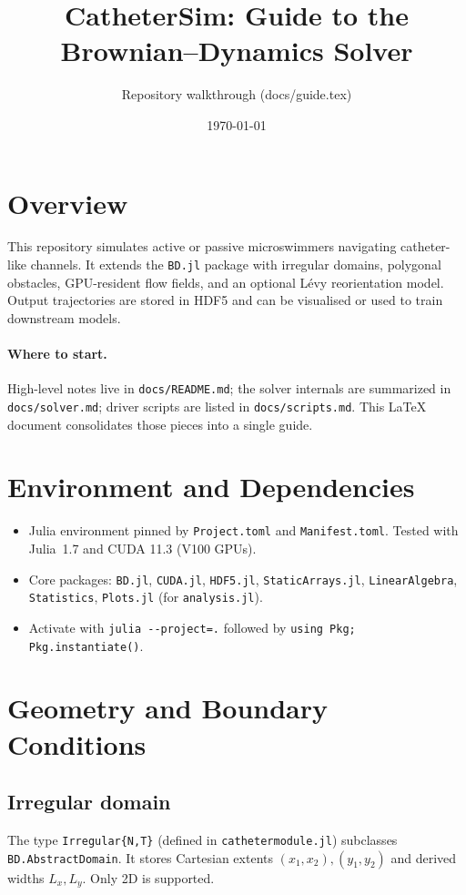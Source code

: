 \documentclass[11pt]{article}
\title{CatheterSim: Guide to the Brownian--Dynamics Solver}
\author{Repository walkthrough (docs/guide.tex)}
\date{\today}
\begin{document}
\maketitle
\tableofcontents
\newpage

\section{Overview}
This repository simulates active or passive microswimmers navigating catheter-like channels. It extends the \texttt{BD.jl} package with irregular domains, polygonal obstacles, GPU-resident flow fields, and an optional L\'evy reorientation model. Output trajectories are stored in HDF5 and can be visualised or used to train downstream models.

\paragraph{Where to start.} High-level notes live in \texttt{docs/README.md}; the solver internals are summarized in \texttt{docs/solver.md}; driver scripts are listed in \texttt{docs/scripts.md}. This \LaTeX{} document consolidates those pieces into a single guide.

\section{Environment and Dependencies}
\begin{itemize}[leftmargin=*]
  \item Julia environment pinned by \texttt{Project.toml} and \texttt{Manifest.toml}. Tested with Julia~1.7 and CUDA 11.3 (V100 GPUs).
  \item Core packages: \texttt{BD.jl}, \texttt{CUDA.jl}, \texttt{HDF5.jl}, \texttt{StaticArrays.jl}, \texttt{LinearAlgebra}, \texttt{Statistics}, \texttt{Plots.jl} (for \texttt{analysis.jl}).
  \item Activate with \verb|julia --project=.|
    followed by \verb|using Pkg; Pkg.instantiate()|.
\end{itemize}

\section{Geometry and Boundary Conditions}
\subsection{Irregular domain}
The type \texttt{Irregular\{N,T\}} (defined in \texttt{cathetermodule.jl}) subclasses \texttt{BD.AbstractDomain}. It stores Cartesian extents \((x_1,x_2),(y_1,y_2)\) and derived widths \(L_x, L_y\). Only 2D is supported.
\end{document}
